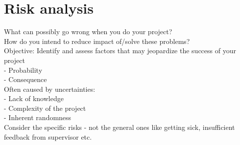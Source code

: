 \chapter{Risk analysis}
\label{chapter7:risk_analysis}


What can possibly go wrong when you do your project? \\
How do you intend to reduce impact of/solve these problems? \\
Objective: Identify and assess factors that may jeopardize the success of your project \\
- Probability \\
- Consequence \\
Often caused by uncertainties: \\
- Lack of knowledge \\
- Complexity of the project \\
- Inherent randomness \\
Consider the specific risks - not the general ones like getting sick, insufficient feedback from supervisor etc.